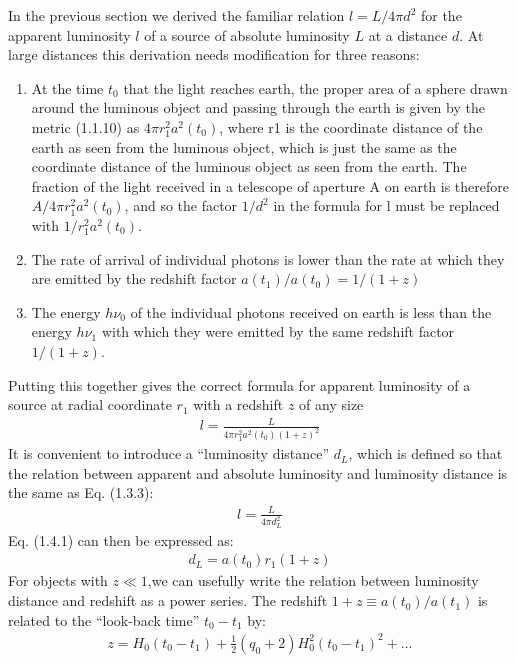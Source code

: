 \documentclass[11pt,a4paper,dvipdfmx]{jsarticle}
\theoremstyle{plain}
\theoremstyle{break}
\begin{document}
In the previous section we derived the familiar relation $l = L/4\pi d^2$ for the apparent luminosity $l$ of a source of absolute luminosity $L$ at a distance $d$. At large distances this derivation needs modification for three reasons:
\begin{enumerate}
  \item
  At the time $t_0$ that the light reaches earth, the proper area of a sphere drawn around the luminous object and passing through the earth is given by the metric (1.1.10)%
  as $4\pi r_1^2 a^2(t_0)$, where r1 is the coordinate distance of the earth as seen from the luminous object, which is just the same as the coordinate distance of the luminous object as seen from the earth. The fraction of the light received in a telescope of aperture A on earth is therefore $A/4\pi r_1^2 a^2(t_0)$, and so the factor $1/d^2$ in the formula for l must be replaced with $1/r_1^2a^2(t_0)$.
  \item
  The rate of arrival of individual photons is lower than the rate at which they are emitted by the redshift factor $a(t_1)/a(t_0) = 1/(1 + z)$
  \item
  The energy $h\nu_0$ of the individual photons received on earth is less than the energy $h\nu_1$ with which they were emitted by the same redshift factor $1/(1 + z)$.
\end{enumerate}
Putting this together gives the correct formula for apparent luminosity of a source at radial coordinate $r_1$ with a redshift $z$ of any size
\begin{align}
  l=\frac{L}{4 \pi r_{1}^{2} a^{2}\left(t_{0}\right)(1+z)^{2}}
\end{align}
It is convenient to introduce a “luminosity distance” $d_L$, which is defined so that the relation between apparent and absolute luminosity and luminosity distance is the same as Eq. (1.3.3):
\begin{align}
  l=\frac{L}{4 \pi d_{L}^{2}}
\end{align}
Eq. (1.4.1) can then be expressed as:
\begin{align}
  d_{L}=a\left(t_{0}\right) r_{1}(1+z)
\end{align}
For objects with $z\ll1$,we can usefully write the relation between luminosity distance and redshift as a power series.
The redshift $1 + z \equiv a(t_0)/a(t_1)$ is related to the “look-back time” $t_0-t_1$ by:
\begin{align}
  z=H_{0}\left(t_{0}-t_{1}\right)+\frac{1}{2}\left(q_{0}+2\right) H_{0}^{2}\left(t_{0}-t_{1}\right)^{2}+\ldots
\end{align}
\end{document}
